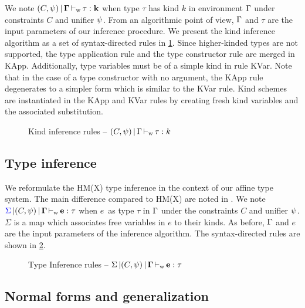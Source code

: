 We note $(C,\mathrm{\psi}) \operatorname{|} \bf{\Gamma} \operatorname{\vdash_w} \bf{\tau} : k$ when type $\tau$ has kind $k$
in environment $\Gamma$ under constraints $C$ and unifier $\mathrm{\psi}$. From an
algorithmic point of view, $\Gamma$ and $\tau$ are the input parameters of
our inference procedure.
We present the kind inference algorithm as a set of syntax-directed rules in
\cref{rules:kinding}.
Since higher-kinded types are not supported, the type application
rule and the type constructor rule are merged in {\sc KApp}.
Additionally, type variables must be of a simple kind in rule {\sc KVar}.
Note that in the case of a type constructor with no argument, the {\sc KApp}
rule degenerates to a simpler form which is similar to the {\sc KVar} rule.
Kind schemes are instantiated in the {\sc KApp} and {\sc KVar} rules by creating
fresh kind variables and the associated substitution.

\begin{figure}[h]
  \centering
  
  \caption{Kind inference rules -- $(C,\mathrm{\psi}) \operatorname{|} \Gamma \operatorname{\vdash_w} \tau : k$}
  \label{rules:kinding}
\end{figure}


\subsection{Type inference}

We reformulate the HM(X) type inference in the context of our affine type
system. The main difference compared to HM(X) are noted in .
We note ${\color{blue}{\Sigma}} \operatorname{|} (C,\mathrm{\psi}) \operatorname{|} \bf{\Gamma} \operatorname{\vdash_w} \bf{e} : \tau$ when
$e$\ as type $\tau$ in $\Gamma$ under the constraints $C$ and unifier $\mathrm{\psi}$.
$\Sigma$ is a map which associates free variables in $e$ to
their kinds.
As before, $\Gamma$ and $e$ are the input parameters of the inference
algorithm. The syntax-directed rules are shown in \cref{rules:typing}.

\begin{figure*}[h]
  
  \caption{Type Inference rules -- $\Sigma \operatorname{|} (C,\psi) \operatorname{|} \bf{\Gamma} \operatorname{\vdash_w} \bf{e} : \tau$ }
  \label{rules:typing}
\end{figure*}

\subsection{Normal forms and generalization}
\label{sec:normalize}

\newcommand\lub\bigvee
\newcommand\glb\bigwedge
\newcommand\CL{{\mathcal C_{\mathcal L}}}

